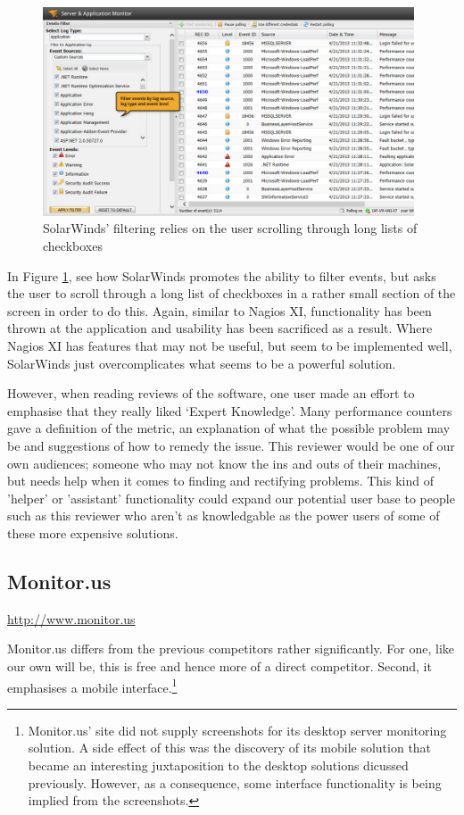 \documentclass{l3proj}
\begin{document}
\begin{figure}[H]
\centering
\includegraphics[width=110mm]{Competitors/SolarWinds_EventFiltering.jpg}
\caption{SolarWinds' filtering relies on the user scrolling through long lists of checkboxes}
\label{fig:SWFiltering}
\end{figure}

In Figure \ref{fig:SWFiltering}, see how SolarWinds promotes the ability to filter events, but asks the user to scroll through a long list of checkboxes in a rather small section of the screen in order to do this. Again, similar to Nagios XI, functionality has been thrown at the application and usability has been sacrificed as a result. Where Nagios XI has features that may not be useful, but seem to be implemented well, SolarWinds just overcomplicates what seems to be a powerful solution.

However, when reading reviews of the software, one user made an effort to emphasise that they really liked ‘Expert Knowledge’. Many performance counters gave a definition of the metric, an explanation of what the possible problem may be and suggestions of how to remedy the issue. This reviewer would be one of our own audiences; someone who may not know the ins and outs of their machines, but needs help when it comes to finding and rectifying problems. This kind of 'helper' or 'assistant' functionality could expand our potential user base to people such as this reviewer who aren't as knowledgable as the power users of some of these more expensive solutions.

\subsection{Monitor.us}

\url{http://www.monitor.us}

Monitor.us differs from the previous competitors rather significantly. For one, like our own will be, this is free and hence more of a direct competitor. Second, it emphasises a mobile interface.\footnote{\raggedright{}Monitor.us' site did not supply screenshots for its desktop server monitoring solution. A side effect of this was the discovery of its mobile solution that became an interesting juxtaposition to the desktop solutions dicussed previously. However, as a consequence, some interface functionality is being implied from the screenshots.}
\end{document}
